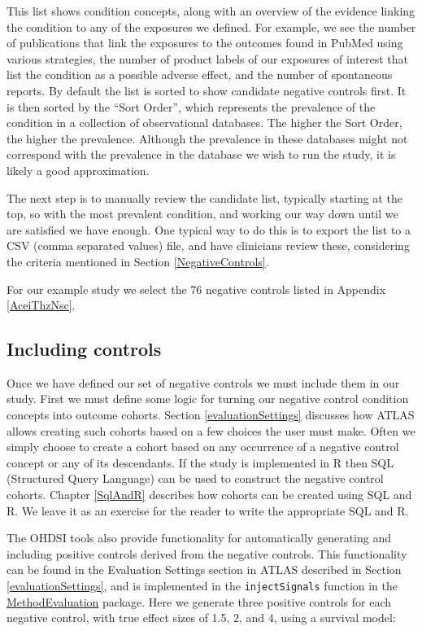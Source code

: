 \documentclass[11pt]{book}
\theoremstyle{definition}
\theoremstyle{definition}
\theoremstyle{definition}
\theoremstyle{remark}
\begin{document}
This list shows condition concepts, along with an overview of the evidence linking the condition to any of the exposures we defined. For example, we see the number of publications that link the exposures to the outcomes found in PubMed using various strategies, the number of product labels of our exposures of interest that list the condition as a possible adverse effect, and the number of spontaneous reports. By default the list is sorted to show candidate negative controls first. It is then sorted by the ``Sort Order'', which represents the prevalence of the condition in a collection of observational databases. The higher the Sort Order, the higher the prevalence. Although the prevalence in these databases might not correspond with the prevalence in the database we wish to run the study, it is likely a good approximation.

The next step is to manually review the candidate list, typically starting at the top, so with the most prevalent condition, and working our way down until we are satisfied we have enough. One typical way to do this is to export the list to a CSV (comma separated values) file, and have clinicians review these, considering the criteria mentioned in Section \ref{NegativeControls}.

For our example study we select the 76 negative controls listed in Appendix \ref{AceiThzNsc}.

\hypertarget{including-controls}{%
\subsection{Including controls}\label{including-controls}}

Once we have defined our set of negative controls we must include them in our study. First we must define some logic for turning our negative control condition concepts into outcome cohorts. Section \ref{evaluationSettings} discusses how ATLAS allows creating such cohorts based on a few choices the user must make. Often we simply choose to create a cohort based on any occurrence of a negative control concept or any of its descendants. If the study is implemented in R then SQL (Structured Query Language) can be used to construct the negative control cohorts. Chapter \ref{SqlAndR} describes how cohorts can be created using SQL and R. We leave it as an exercise for the reader to write the appropriate SQL and R.

The OHDSI tools also provide functionality for automatically generating and including positive controls derived from the negative controls. This functionality can be found in the Evaluation Settings section in ATLAS described in Section \ref{evaluationSettings}, and is implemented in the \texttt{injectSignals} function in the \href{https://ohdsi.github.io/MethodEvaluation/}{MethodEvaluation} package. Here we generate three positive controls for each negative control, with true effect sizes of 1.5, 2, and 4, using a survival model:
\end{document}
